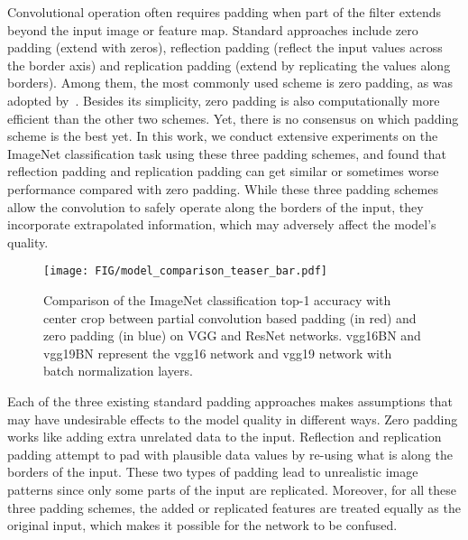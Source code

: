 \documentclass[10pt,twocolumn,letterpaper]{article}
\begin{document}
Convolutional operation often requires padding when part of the filter extends beyond the input image or feature map. Standard approaches include zero padding (extend with zeros), reflection padding (reflect the input values across the border axis) and replication padding (extend by replicating the values along borders).
Among them, the most commonly used scheme is zero padding, as was adopted by~\cite{krizhevsky2012imagenet}. Besides its simplicity, zero padding is also computationally more efficient than the other two schemes. Yet, there is no consensus on which padding scheme is the best yet. In this work, we conduct extensive experiments on the ImageNet classification task using these three padding schemes, and found that reflection padding and replication padding can get similar or sometimes worse performance compared with zero padding. While these three padding schemes allow the convolution to safely operate along the borders of the input, they incorporate extrapolated information, which may adversely affect the model's quality. 

\begin{figure}
    \centering
    \texttt{[image: FIG/model\_comparison\_teaser\_bar.pdf]}
    \caption{Comparison of the ImageNet classification top-1 accuracy with center crop between partial convolution based padding (in red) and zero padding (in blue) on VGG and ResNet networks. vgg16BN and vgg19BN represent the vgg16 network and vgg19 network with batch normalization layers.}
    \label{fig:teaser}
\end{figure}

Each of the three existing standard padding approaches makes assumptions that may have undesirable effects to the model quality in different ways. Zero padding works like adding extra unrelated data to the input. Reflection and replication padding attempt to pad with plausible data values by re-using what is along the borders of the input. These two types of padding lead to unrealistic image patterns since only some parts of the input are replicated. Moreover, for all these three padding schemes, the added or replicated features are treated equally as the original input, which makes it possible for the network to be confused. 
\end{document}
